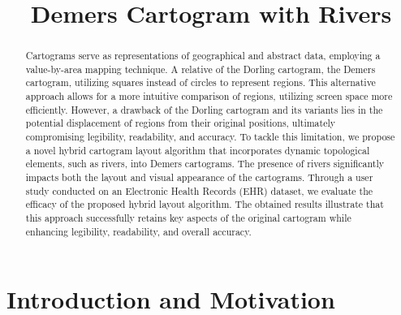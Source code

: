 \documentclass[Afour,sagev,times]{sagej}
\begin{document}
\title{Demers Cartogram with Rivers}

\begin{abstract}
    Cartograms serve as representations of geographical and abstract data, employing a value-by-area mapping technique. A relative of the Dorling cartogram, the Demers cartogram, utilizing squares instead of circles to represent regions. This alternative approach allows for a more intuitive comparison of regions, utilizing screen space more efficiently. However, a drawback of the Dorling cartogram and its variants lies in the potential displacement of regions from their original positions, ultimately compromising legibility, readability, and accuracy. To tackle this limitation, we propose a novel hybrid cartogram layout algorithm that incorporates dynamic topological elements, such as rivers, into Demers cartograms. The presence of rivers significantly impacts both the layout and visual appearance of the cartograms. Through a user study conducted on an Electronic Health Records (EHR) dataset, we evaluate the efficacy of the proposed hybrid layout algorithm. The obtained results illustrate that this approach successfully retains key aspects of the original cartogram while enhancing legibility, readability, and overall accuracy.
\end{abstract}


\maketitle

\section{Introduction and Motivation}
\end{document}
